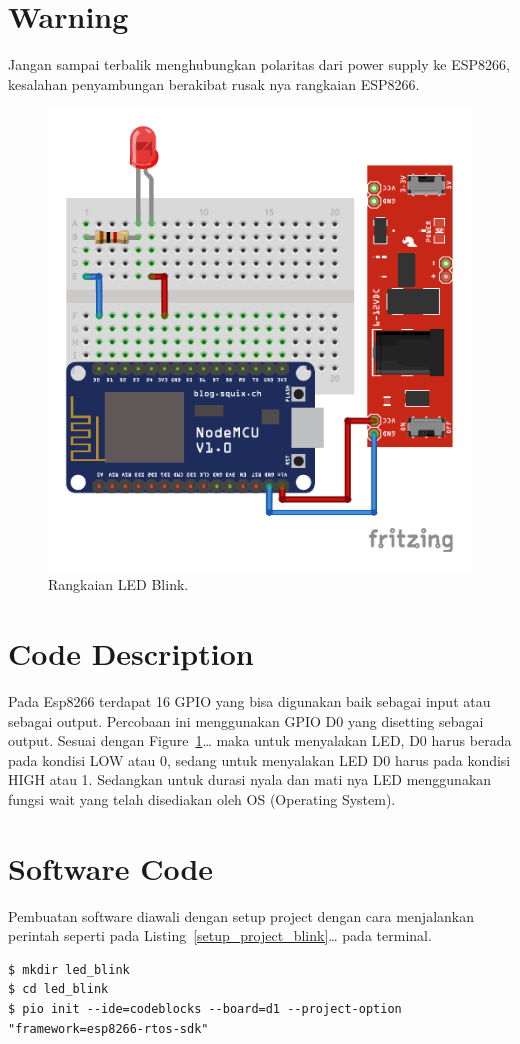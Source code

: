 \section{Warning}
Jangan sampai terbalik menghubungkan polaritas dari power supply ke ESP8266, kesalahan penyambungan berakibat rusak nya rangkaian ESP8266.

\newpage

\begin{figure}[h]
\centering
\includegraphics[width=0.9\linewidth]{sch/led_blink_bb}
\caption{Rangkaian LED Blink.}
\label{circuit01}
\end{figure}

\section{Code Description}
Pada Esp8266 terdapat 16 GPIO yang bisa digunakan baik sebagai input atau sebagai output. Percobaan ini menggunakan GPIO D0 yang disetting sebagai output. Sesuai dengan Figure~\ref{circuit01}\ldots{} maka untuk menyalakan LED, D0 harus berada pada kondisi LOW atau 0, sedang untuk menyalakan LED D0 harus pada kondisi HIGH atau 1. Sedangkan untuk durasi nyala dan mati nya LED menggunakan fungsi wait yang telah disediakan oleh OS (Operating System).

\section{Software Code}
Pembuatan software diawali dengan setup project dengan cara menjalankan perintah seperti pada Listing~\ref{setup_project_blink}\ldots{} pada terminal.
\newpage
\begin{lstlisting}[label=setup_project_blink,caption=Setup project blink,style=bash]
$ mkdir led_blink
$ cd led_blink
$ pio init --ide=codeblocks --board=d1 --project-option "framework=esp8266-rtos-sdk"
\end{lstlisting}

